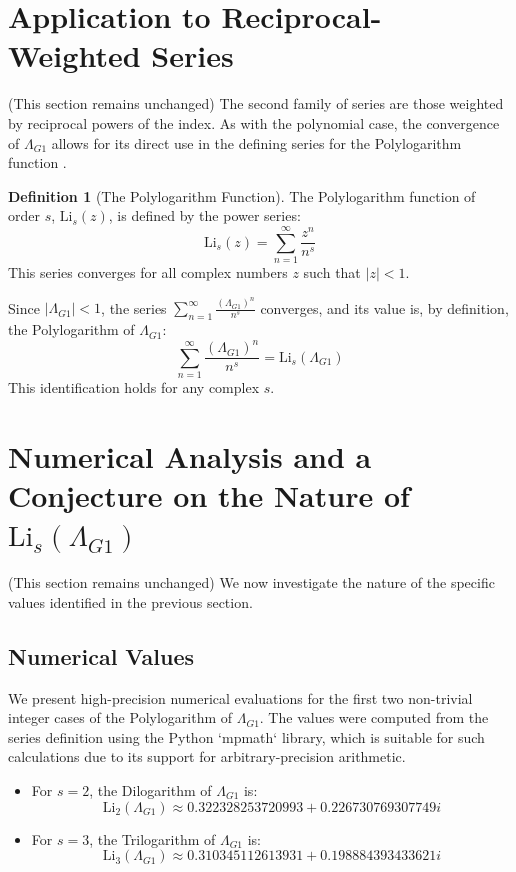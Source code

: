 \documentclass{amsart}
\theoremstyle{plain}
\theoremstyle{definition}
\newtheorem{definition}[theorem]{Definition}
\theoremstyle{remark}
\newcommand{\LambdaG}{\Lambda_{G1}}
\begin{document}
\section{Application to Reciprocal-Weighted Series}
(This section remains unchanged)
The second family of series are those weighted by reciprocal powers of the index. As with the polynomial case, the convergence of $\LambdaG$ allows for its direct use in the defining series for the Polylogarithm function \cite{Lewin}.

\begin{definition}[The Polylogarithm Function]
The Polylogarithm function of order $s$, $\mathrm{Li}_s(z)$, is defined by the power series:
$$ \mathrm{Li}_s(z) = \sum_{n=1}^{\infty} \frac{z^n}{n^s} $$
This series converges for all complex numbers $z$ such that $|z|<1$.
\end{definition}

Since $|\LambdaG| < 1$, the series $\sum_{n=1}^{\infty} \frac{(\LambdaG)^{n}}{n^s}$ converges, and its value is, by definition, the Polylogarithm of $\LambdaG$:
$$ \sum_{n=1}^{\infty} \frac{(\LambdaG)^{n}}{n^s} = \mathrm{Li}_s(\LambdaG) $$
This identification holds for any complex $s$.

\section{Numerical Analysis and a Conjecture on the Nature of \texorpdfstring{$\mathrm{Li}_s(\Lambda_{G1})$}{Li\_s(Lambda\_G1)}}
(This section remains unchanged)
We now investigate the nature of the specific values identified in the previous section.

\subsection{Numerical Values}
We present high-precision numerical evaluations for the first two non-trivial integer cases of the Polylogarithm of $\LambdaG$. The values were computed from the series definition using the Python `mpmath` library, which is suitable for such calculations due to its support for arbitrary-precision arithmetic.
\begin{itemize}
    \item For $s=2$, the Dilogarithm of $\LambdaG$ is:
    $$ \mathrm{Li}_2(\LambdaG) \approx 0.322328253720993 + 0.226730769307749i $$
    \item For $s=3$, the Trilogarithm of $\LambdaG$ is:
    $$ \mathrm{Li}_3(\LambdaG) \approx 0.310345112613931 + 0.198884393433621i $$
\end{itemize}
\end{document}
